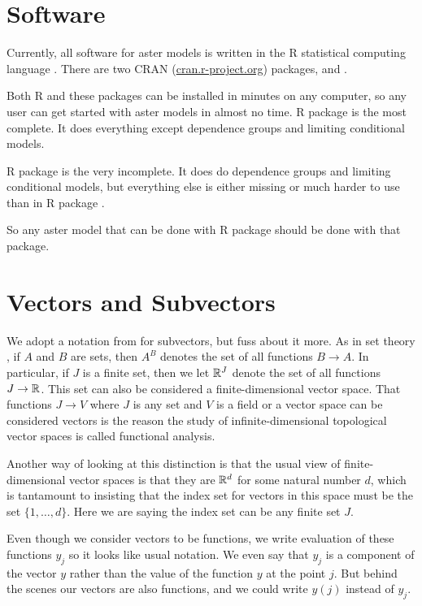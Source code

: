 \section{Software}
\label{sec:software}

Currently, all software for aster models is written in the R statistical
computing language \citep{r-core}.  There are two CRAN
(\url{cran.r-project.org}) packages,  \citep{aster-package} and
 \citep{aster2-package}.

Both R and these packages can be installed in minutes on any computer,
so any user can get started with aster models in almost no time.
R package  is the most complete.
It does everything except dependence groups
and limiting conditional models.

R package  is the very incomplete.
It does do dependence groups and limiting conditional models, but everything
else is either missing or much harder to use than in R package .

So any aster model that can be done with R package  should
be done with that package.

\section{Vectors and Subvectors}

We adopt a notation from \citet{lauritzen} for subvectors, but fuss about it
more.  As in set theory \citep[Section~8]{halmos-set-theory}, if $A$ and $B$
are sets, then $A^B$ denotes the set of all functions $B \to A$.
In particular, if $J$ is a finite set, then we let $\mathbb{R}^J$ denote
the set of all functions $J \to \mathbb{R}$.  This set can also be considered
a finite-dimensional vector space.  That functions $J \to V$ where $J$ is
any set and $V$ is a field or a vector space can be considered
vectors is the reason the study of infinite-dimensional topological vector
spaces is called functional analysis.

Another way of looking at this distinction is that the usual view of
finite-dimensional vector spaces is that they are $\mathbb{R}^d$ for some
natural number $d$, which is tantamount to insisting that the index
set for vectors in this space must be the set $\{1, \ldots, d\}$.
Here we are saying the index set can be any finite set $J$.

Even though we consider vectors to be functions, we write evaluation
of these functions $y_j$ so it looks like usual notation.  We even say
that $y_j$ is a component of the vector $y$ rather than the value of
the function $y$ at the point $j$.  But behind the scenes our vectors
are also functions, and we could write $y(j)$ instead of $y_j$.

